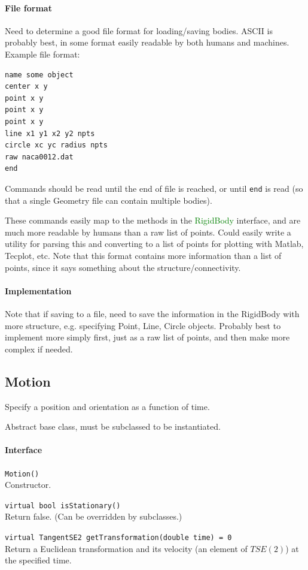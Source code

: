\documentclass[11pt]{article}
\def\class#1{\textcolor{green}{\ttfamily\small #1}} %
\let\code\lstinline
\begin{document}
\paragraph{File format}
Need to determine a good file format for loading/saving bodies.  ASCII is probably best, in some format easily readable by both humans and machines.  Example file format:
\begin{verbatim}
name some object
center x y
point x y
point x y
point x y
line x1 y1 x2 y2 npts
circle xc yc radius npts
raw naca0012.dat
end
\end{verbatim}
Commands should be read until the end of file is reached, or until {\tt end} is read (so that a single Geometry file can contain multiple bodies).

These commands easily map to the methods in the \class{RigidBody} interface, and are much more readable by humans than a raw list of points.  Could easily write a utility for parsing this and converting to a list of points for plotting with Matlab, Tecplot, etc.  Note that this format contains more information than a list of points, since it says something about the structure/connectivity.

\paragraph{Implementation}
Note that if saving to a file, need to save the information in the RigidBody with more structure, e.g. specifying Point, Line, Circle objects.  Probably best to implement more simply first, just as a raw list of points, and then make more complex if needed.

\subsection{Motion}
Specify a position and orientation as a function of time.

Abstract base class, must be subclassed to be instantiated.

\paragraph{Interface}
\begin{description}
	\item \code|Motion()| \\
		Constructor.
	\item \code|virtual bool isStationary()| \\
		Return false.  (Can be overridden by subclasses.)
	\item \code|virtual TangentSE2 getTransformation(double time) = 0| \\
		Return a Euclidean transformation and its velocity (an element of $TSE(2)$) at the specified time.
\end{description}
\end{document}
